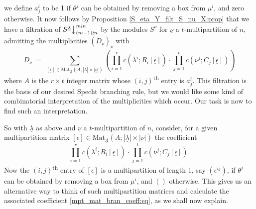 \documentclass[ALCO,Unicode,published]{cedram}
\newcommand{\tss}[1]{\textsuperscript{#1}}
\newcommand{\ul}[1]{\underline{#1}}
\newcommand{\cDot}{\boldsymbol{\cdot}}
\begin{document}
we define $a^i_j$ to be 1 if $\theta^j$ can be obtained by removing a box from $\mu^i$, and zero otherwise.
It now follows by Proposition \ref{S_eta_Y_filt_S_nu_X:prop} that we have a filtration of
$S^{\ul{\lambda}}\bigr\downarrow^{m \wr n}_{(m-1) \wr n}$ by the modules $S^{\ul{\nu}}$ for $\ul{\nu}$ a $t$-multipartition of $n$, admitting the
multiplicities $(D_{\ul{\nu}})_{\ul{\nu}}$ with
\[
D_{\ul{\nu}} \; = \; \sum_{[\ul{\epsilon}] \in\mathrm{Mat}_{\ul{\Lambda}}(A;|\ul{\lambda}|\times|\ul{\nu}|)}
\left(\prod^r_{i=1}c(\lambda^i;R_i[\ul{\epsilon}])\:\cDot\:\prod^t_{j=1}c(\nu^j;C_j[\ul{\epsilon}])\right)
\]
where $A$ is the $r \times t$ integer matrix whose $(i,j)$\tss{th} entry is $a^i_j$. This filtration is the basis of our desired Specht
branching rule, but we would like some kind of combinatorial interpretation of the multiplicities which occur. Our task
is now to find such an interpretation.

So with $\ul{\lambda}$ as above and $\ul{\nu}$ a $t$-multipartition of $n$, consider, for a given multipartition
matrix
$[\ul{\epsilon}] \in \mathrm{Mat}_{\ul{\Lambda}}(A;|\ul{\lambda}|\times|\ul{\nu}|)$ the coefficient
\begin{equation}\label{mpt_mat_bran_coeff:eq}
\prod^r_{i=1}c(\lambda^i;R_i[\ul{\epsilon}])\:\cDot\:\prod^t_{j=1}c(\nu^j;C_j[\ul{\epsilon}]).
\end{equation}
Now the
$(i,j)$\tss{th} entry of $[\ul{\epsilon}]$ is a multipartition of length 1, say $(\epsilon^{ij})$, if $\theta^j$ can be obtained by
removing a box from $\mu^i$, and $()$ otherwise. This gives us an alternative way to think of such multipartition matrices and calculate
the associated coefficient \eqref{mpt_mat_bran_coeff:eq}, as we shall now explain.
\end{document}
